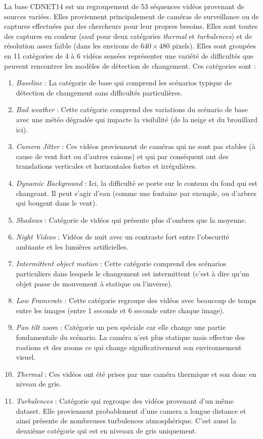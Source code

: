 	La base CDNET14 est un regroupement de 53 séquences vidéos provenant de sources variées. Elles proviennent principalement de caméras de surveillance ou de captures effectuées par des chercheurs pour leur propres besoins. Elles sont toutes des captures en couleur (sauf pour deux catégories \textit{thermal} et \textit{turbulences}) et de résolution assez faible (dans les environs de $640 \times 480$ pixels). Elles sont groupées en 11 catégories de 4 à 6 vidéos sensées représenter une variété de difficultés que peuvent rencontrer les modèles de détection de changement. Ces catégories sont :
	\begin{enumerate}
		\item \textit{Baseline} : La catégorie de base qui comprend les scénarios typique de détection de changement sans difficultés particulières.
		\item \textit{Bad weather} : Cette catégorie comprend des variations du scénario de base avec une météo dégradée qui impacte la visibilité (de la neige et du brouillard ici).
		\item \textit{Camera Jitter} : Ces vidéos proviennent de caméras qui ne sont pas stables (à cause de vent fort ou d'autres raisons) et qui par conséquent ont des translations verticales et horizontales fortes et irrégulières. 
		\item \textit{Dynamic Background} : Ici, la difficulté se porte sur le contenu du fond qui est changeant. Il peut s'agir d'eau (comme une fontaine par exemple, ou d'arbres qui bougent dans le vent).
		\item \textit{Shadows} : Catégorie de vidéos qui présente plus d'ombres que la moyenne.
		\item \textit{Night Videos} : Vidéos de nuit avec un contraste fort entre l'obscurité ambiante et les lumières artificielles.
		\item \textit{Intermittent object motion} : Cette catégorie comprend des scénarios particuliers dans lesquels le changement est intermittent (c'est à dire qu'un objet passe de mouvement à statique ou l'inverse).
		\item \textit{Low Framerate} : Cette catégorie regroupe des vidéos avec beaucoup de temps entre les images (entre 1 seconde et 6 seconde entre chaque image).
		\item \textit{Pan tilt zoom} : Catégorie un peu spéciale car elle change une partie fondamentale du scénario. La caméra n'est plus statique mais effectue des roations et des zooms ce qui change significativement son environnement visuel. 
		\item \textit{Thermal} : Ces vidéos ont été prises par une caméra thermique et son donc en niveau de gris.
		\item \textit{Turbulences} : Catégorie qui regroupe des vidéos provenant d'un même dataset. Elle proviennent probablement d'une camera a longue distance et ainsi présente de nombreuses turbulences atmosphérique. C'est aussi la deuxième catégorie qui est en niveaux de gris uniquement.
	\end{enumerate}

